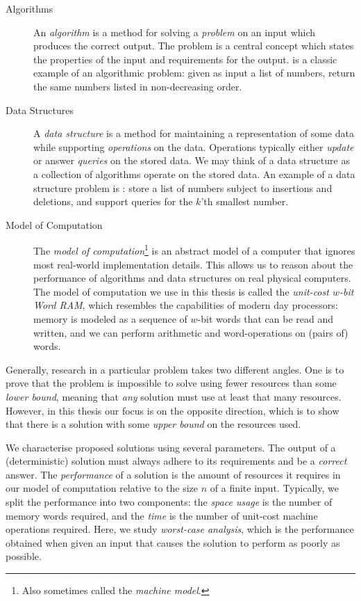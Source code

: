 \begin{description}
    \item[Algorithms] 
    An \emph{algorithm} is a method for solving a \emph{problem} on an input which produces the correct output. 
    The problem is a central concept which states the properties of the input and requirements for the output.
     is a classic example of an algorithmic problem: given as input a list of numbers, return the same numbers listed in non-decreasing order.
    \item[Data Structures] 
    A \emph{data structure} is a method for maintaining a representation of some data while supporting \emph{operations} on the data. Operations typically either \emph{update} or answer \emph{queries} on the stored data. We may think of a data structure as a collection of algorithms operate on the stored data.
    An example of a data structure problem is : store a list of numbers subject to insertions and deletions, and support queries for the $k$'th smallest number.
    \item[Model of Computation] 
    The \emph{model of computation}\footnote{Also sometimes called the \emph{machine model}.} is an abstract model of a computer that ignores most real-world implementation details. This allows us to reason about the performance of algorithms and data structures on real physical computers.
    The model of computation we use in this thesis is called the \emph{unit-cost $w$-bit Word RAM}, which resembles the capabilities of modern day processors: 
    memory is modeled as a sequence of $w$-bit words that can be read and written, and we can perform arithmetic and word-operations on (pairs of) words.
\end{description}

Generally, research in a particular problem takes two different angles. 
One is to prove that the problem is impossible to solve using fewer resources than some \emph{lower bound}, meaning that \emph{any} solution must use at least that many resources. However, in this thesis our focus is on the opposite direction, which is to show that there is a solution with some \emph{upper bound} on the resources used.

We characterise proposed solutions using several parameters.
The output of a (deterministic) solution must always adhere to its requirements and be a \emph{correct} answer.
The \emph{performance} of a solution is the amount of resources it requires in our model of computation relative to the size $n$ of a finite input. Typically, we split the performance into two components: the \emph{space usage} is the number of memory words required, and the \emph{time} is the number of unit-cost machine operations required. Here, we study \emph{worst-case analysis}, which is the performance obtained when given an input that causes the solution to perform as poorly as possible.

